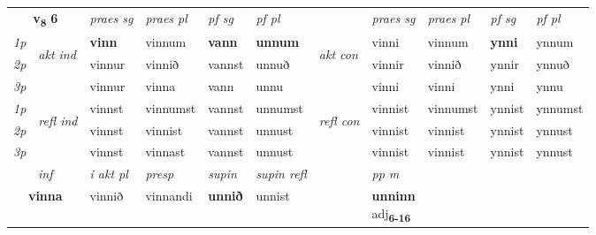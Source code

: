 \noindent
\begin{tabular}{lllllllllll} \toprule
\multicolumn{2}{c}{\textbf{v{\textsubscript{8}}} \Large{\textbf{6}}}  &  \textit{praes sg}  & \textit{praes pl}  &\textit{ pf sg} & \textit{pf pl} &  &  \textit{praes sg}  & \textit{praes pl}  & \textit{pf sg} & \textit{pf pl } \\*
	\cmidrule{3-6} \cmidrule{8-11}
 {\textit{1p}} & \multirow{3}{*}{\begin{turn}{90}\textit{akt ind}\end{turn}} & \textbf{vinn} & vinnum & \textbf{vann} & \textbf{unnum} & \multirow{3}{*}{\begin{turn}{90}\textit{akt con}\end{turn}} &vinni & vinnum & \textbf{ynni} & ynnum\\*
 {\textit{2p}} &  &  vinnur  & vinnið & vannst & unnuð & & vinnir & vinnið & ynnir & ynnuð \\*
{\textit{3p}} &  & vinnur & vinna & vann & unnu & & vinni & vinni& ynni & ynnu \\*
\cmidrule{3-6} \cmidrule{8-11}
 {\textit{1p}} & \multirow{3}{*}{\begin{turn}{90}\textit{refl ind}\end{turn}}  & vinnst & vinnumst & vannst & unnumst & \multirow{3}{*}{\begin{turn}{90}\textit{refl con}\end{turn}}  &vinnist & vinnumst & ynnist & ynnumst \\*
 {\textit{2p}} &  & vinnst & vinnist & vannst & unnust & &vinnist & vinnist & ynnist & ynnust \\*
 {\textit{3p}}  & & vinnst & vinnast & vannst & unnust & & vinnist & vinnist& ynnist & ynnust \\*
\cmidrule{3-6} \cmidrule{8-11}

   \multicolumn{2}{c}{\textit{inf}}  & \textit{i akt pl}   & \textit{presp} & \textit{supin} & \textit{supin refl} && \textit{pp m} \\*
  \multicolumn{2}{c}{\textbf{vinna}}   & vinnið   & vinnandi &  \textbf{unnið} & unnist && \specialcell{\textbf{unninn} \\ adj\textbf{\textsubscript{6-16}}} \\*
\end{tabular}

